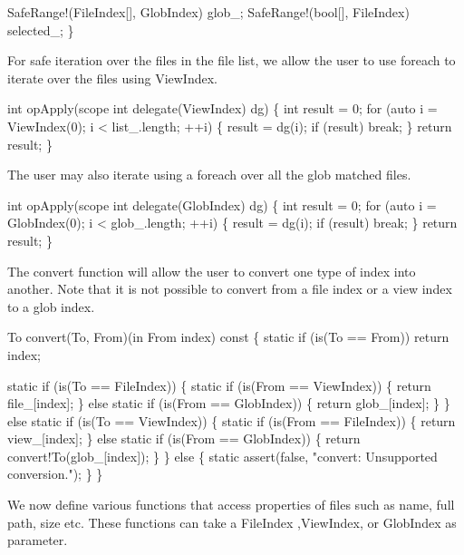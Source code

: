   SafeRange!(FileIndex[], GlobIndex) glob_;
  SafeRange!(bool[], FileIndex)      selected_;
\}

\nwendcode{}For safe iteration over the files in the file list, we allow the
user to use {\Tt{}foreach\nwendquote} to iterate over the files using {\Tt{}ViewIndex\nwendquote}.

\nwenddocs{}\endmoddef\nwstartdeflinemarkup\nwenddeflinemarkup
int opApply(scope int delegate(ViewIndex) dg) \{
  int result = 0;
  for (auto i = ViewIndex(0);
            i < list_.length;
            ++i) \{
    result = dg(i);
    if (result) break;
  \}
  return result;
\}

\nwendcode{}The user may also iterate using a {\Tt{}foreach\nwendquote} over all the glob
matched files.

\nwenddocs{}\plusendmoddef\nwstartdeflinemarkup\nwenddeflinemarkup
int opApply(scope int delegate(GlobIndex) dg) \{
  int result = 0;
  for (auto i = GlobIndex(0);
            i < glob_.length;
            ++i) \{
    result = dg(i);
    if (result) break;
  \}
  return result;
\}

\nwendcode{}The {\Tt{}convert\nwendquote} function will allow the user to convert one type of
index into another. Note that it is not possible to convert from a
file index or a view index to a glob index.

\nwenddocs{}\plusendmoddef\nwstartdeflinemarkup\nwenddeflinemarkup
To convert(To, From)(in From index) const \{
  static if (is(To == From)) return index;
  
  static if (is(To == FileIndex)) \{
    static if (is(From == ViewIndex)) \{
      return file_[index];
    \} else static if (is(From == GlobIndex)) \{
      return glob_[index];
    \}
  \} else static if (is(To == ViewIndex)) \{
    static if (is(From == FileIndex)) \{
      return view_[index];
    \} else static if (is(From == GlobIndex)) \{
      return convert!To(glob_[index]);
    \}
  \} else \{
    static assert(false, "convert: Unsupported conversion.");
  \}
\}

\nwendcode{}We now define various functions that access properties of files such
as name, full path, size etc. These functions can take a {\Tt{}FileIndex\nwendquote}
,{\Tt{}ViewIndex\nwendquote}, or {\Tt{}GlobIndex\nwendquote} as parameter.

